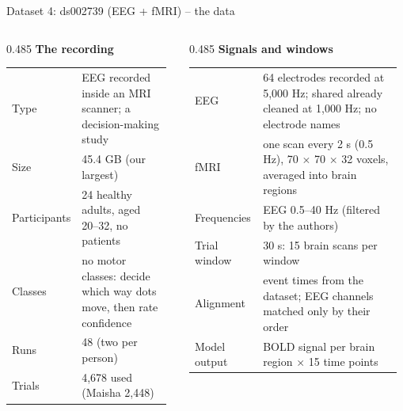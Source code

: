 \documentclass[aspectratio=169,11pt]{beamer}
\newcommand{\colhead}[1]{\textbf{#1}\par\vspace{2pt}}
\begin{document}
\begin{frame}{Dataset 4: ds002739 (EEG + fMRI) -- the data}
\begin{slidebox}
\scriptsize
\begin{columns}[T,onlytextwidth]
\begin{column}{0.485\textwidth}
\colhead{\small The recording}
\begin{tabular}{@{}p{0.3\linewidth}p{0.66\linewidth}@{}}
\toprule
Type & EEG recorded inside an MRI scanner; a decision-making study \\
Size & 45.4 GB (our largest) \\
Participants & 24 healthy adults, aged 20--32, no patients \\
Classes & no motor classes: decide which way dots move, then rate confidence \\
Runs & 48 (two per person) \\
Trials & 4,678 used (Maisha 2,448) \\
\bottomrule
\end{tabular}
\end{column}
\begin{column}{0.485\textwidth}
\colhead{\small Signals and windows}
\begin{tabular}{@{}p{0.3\linewidth}p{0.66\linewidth}@{}}
\toprule
EEG & 64 electrodes recorded at 5,000 Hz; shared already cleaned at 1,000 Hz; no electrode names \\
fMRI & one scan every 2 s (0.5 Hz), 70 $\times$ 70 $\times$ 32 voxels, averaged into brain regions \\
Frequencies & EEG 0.5--40 Hz (filtered by the authors) \\
Trial window & 30 s: 15 brain scans per window \\
Alignment & event times from the dataset; EEG channels matched only by their order \\
Model output & BOLD signal per brain region $\times$ 15 time points \\
\bottomrule
\end{tabular}
\end{column}
\end{columns}
\end{slidebox}
\end{frame}
\end{document}
